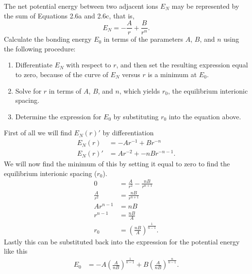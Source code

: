 The net potential energy between two adjacent ions $E_N$ may be represented by the sum of Equations 2.6a and 2.6c, that is,
\[ 
E_N = - \frac{A}{r} + \frac{B}{r^{n}}
.\]
Calculate the bonding energy $E_0$ in terms of the parameters $A$, $B$, and $n$ using the following procedure:
\begin{enumerate}
  \item Differentiate $E_N$ with respect to $r$, and then set the resulting expression equal to zero, because of the curve of $E_N$ versus $r$ is a minimum at $E_0$.
  \item Solve for $r$ in terms of $A$, $B$, and $n$, which yields $r_0$, the equilibrium interionic spacing.
  \item Determine the expression for $E_0$ by substituting $r_0$ into the equation above.
\end{enumerate}
\bigbreak
First of all we will find $E_N(r)'$ by differentiation
\begin{align*}
  E_N (r) &= -A r^{-1} + B r^{-n} \\
  E_N(r)' &= A r^{-2} + -nB r^{-n-1}
.\end{align*}
We will now find the minimum of this by setting it equal to zero to find the equilibrium interionic spacing ($r_0$).
\begin{align*}
  0 &= \frac{A}{r^2} - \frac{nB}{r^{n+1}} \\
  \frac{A}{r^2} &= \frac{nB}{r^{n+1}} \\
  Ar^{n-1} &= nB \\
  r^{n-1} &= \frac{nB}{A} \\
  r_0 &= \left( \frac{nB}{A} \right)^{\frac{1}{n-1}}
.\end{align*}
Lastly this can be substituted back into the expression for the potential energy like this
\begin{align*}
  E_0 &= -A \left( \frac{A}{nB} \right)^{\frac{1}{n-1}} + B \left( \frac{A}{nB} \right)^{\frac{n}{n-1}}
.\end{align*}

